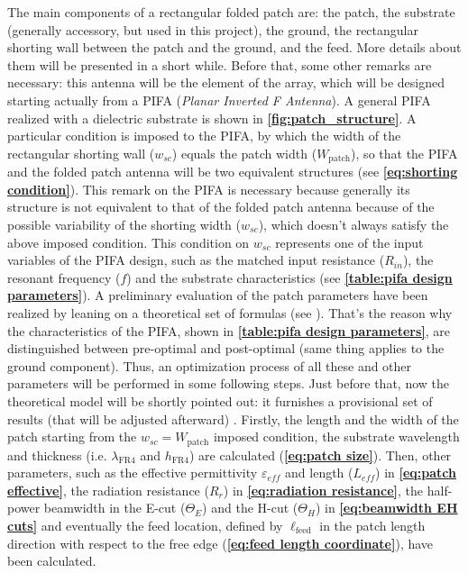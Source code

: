 \documentclass[10 pt,a4paper,twocolumn]{article}
\begin{document}
{The main components of a rectangular folded patch are: the patch, the substrate (generally accessory, but used in this project), the ground, the rectangular shorting wall between the patch and the ground, and the feed. More details about them will be presented in a short while. Before that, some other remarks are necessary: this antenna will be the element of the array, which will be designed starting actually from a PIFA (\emph{Planar Inverted F Antenna}).
A general PIFA realized with a dielectric substrate is shown in \textbf{\cref{fig:patch_structure}}. A particular condition is imposed to the PIFA, by which the width of the rectangular shorting wall ($w_{sc}$) equals the patch width ($W_{\operatorname{patch}}$), so that the PIFA and the folded patch antenna will be two equivalent structures (see \textbf{\cref{eq:shorting condition}}). This remark on the PIFA is necessary because generally its structure is not equivalent to that of the folded patch antenna because of the possible variability of the shorting width ($w_{sc}$), which doesn't always satisfy the above imposed condition. This condition on $w_{sc}$ represents one of the input variables of the PIFA design, such as the matched input resistance ($R_{in}$), the resonant frequency ($f$) and the substrate characteristics (see \textbf{\cref{table:pifa design parameters}}). A preliminary evaluation of the patch parameters have been realized by leaning on a theoretical set of formulas (see \textbf{\cite{Balanis1}}). That's the reason why the characteristics of the PIFA, shown in \textbf{\cref{table:pifa design parameters}}, are distinguished between pre-optimal and post-optimal (same thing applies to the ground component). Thus, an optimization process of all these and other parameters will be performed in some following steps. Just before that, now the theoretical model will be shortly pointed out: it furnishes a provisional set of results (that will be adjusted afterward) . Firstly, the length and the width of the patch starting from the $w_{sc}=W_{\operatorname{patch}}$ imposed condition, the substrate wavelength and thickness (i.e. $\lambda_{\operatorname{FR4}}$ and $h_{\operatorname{FR4}}$) are calculated (\textbf{\cref{eq:patch size}}). Then, other parameters, such as the effective permittivity $\varepsilon_{eff}$  and length ($L_{eff}$) in \textbf{\cref{eq:patch effective}}, the radiation resistance ($R_r$) in \textbf{\cref{eq:radiation resistance}}, the half-power beamwidth in the E-cut ($\Theta_E$) and the H-cut ($\Theta_H$) in \textbf{\cref{eq:beamwidth EH cuts}} and eventually the feed location, defined by $\ell_{\operatorname{feed}}$ in the patch length direction with respect to the free edge (\textbf{\cref{eq:feed length coordinate}}), have been calculated. 
}
\end{document}
